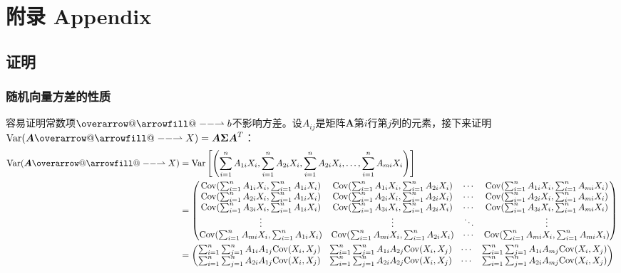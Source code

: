 \documentclass[UTF8]{ctexbook}
\makeatletter
\newcommand*{\overrightharpoonup}{\mathpalette{\overarrow@\rightharpoonupfill@}}
\newcommand*{\rightharpoonupfill@}{\arrowfill@\relbar\relbar\rightharpoonup}
\let\Vector\overrightharpoonup
\makeatother
\begin{document}
\chapter{附录 Appendix}
\section{证明}
\subsection{随机向量方差的性质}
\label{proof:vector-var-prop}
容易证明常数项$\Vector{b}$不影响方差。设$A_{ij}$是矩阵$\boldsymbol{A}$第$i$行第$j$列的元素，接下来证明$\mathrm{Var}(\boldsymbol{A}\Vector{X})=\boldsymbol{A}\boldsymbol{\Sigma}\boldsymbol{A}^T$：
\begin{align*}
	\mathrm{Var}(\boldsymbol{A}\Vector{X})&=\mathrm{Var}\left[\left(\sum_{i=1}^nA_{1i}X_i, \sum_{i=1}^nA_{2i}X_i,\sum_{i=1}^nA_{2i}X_i, \dots, \sum_{i=1}^nA_{mi}X_i\right)\right] \\
	&=\begin{pmatrix}
		\mathrm{Cov}(\sum_{i=1}^nA_{1i}X_i, \sum_{i=1}^nA_{1i}X_i) & \mathrm{Cov}(\sum_{i=1}^nA_{1i}X_i, \sum_{i=1}^nA_{2i}X_i) & \cdots & \mathrm{Cov}(\sum_{i=1}^nA_{1i}X_i, \sum_{i=1}^nA_{mi}X_i) \\
		\mathrm{Cov}(\sum_{i=1}^nA_{2i}X_i, \sum_{i=1}^nA_{1i}X_i) & \mathrm{Cov}(\sum_{i=1}^nA_{2i}X_i, \sum_{i=1}^nA_{2i}X_i) & \cdots & \mathrm{Cov}(\sum_{i=1}^nA_{2i}X_i, \sum_{i=1}^nA_{mi}X_i) \\
		\mathrm{Cov}(\sum_{i=1}^nA_{3i}X_i, \sum_{i=1}^nA_{1i}X_i) & \mathrm{Cov}(\sum_{i=1}^nA_{3i}X_i, \sum_{i=1}^nA_{2i}X_i) & \cdots & \mathrm{Cov}(\sum_{i=1}^nA_{3i}X_i, \sum_{i=1}^nA_{mi}X_i) \\
		\vdots & \vdots & \ddots & \vdots \\
		\mathrm{Cov}(\sum_{i=1}^nA_{mi}X_i, \sum_{i=1}^nA_{1i}X_i) & \mathrm{Cov}(\sum_{i=1}^nA_{mi}X_i, \sum_{i=1}^nA_{2i}X_i) & \cdots & \mathrm{Cov}(\sum_{i=1}^nA_{mi}X_i, \sum_{i=1}^nA_{mi}X_i)
	\end{pmatrix} \\
	&=\begin{pmatrix}
		\sum_{i=1}^n\sum_{j=1}^nA_{1i}A_{1j}\mathrm{Cov}(X_i, X_j) & \sum_{i=1}^n\sum_{j=1}^nA_{1i}A_{2j}\mathrm{Cov}(X_i, X_j) & \cdots & \sum_{i=1}^n\sum_{j=1}^nA_{1i}A_{mj}\mathrm{Cov}(X_i, X_j) \\
		\sum_{i=1}^n\sum_{j=1}^nA_{2i}A_{1j}\mathrm{Cov}(X_i, X_j) & \sum_{i=1}^n\sum_{j=1}^nA_{2i}A_{2j}\mathrm{Cov}(X_i, X_j) & \cdots & \sum_{i=1}^n\sum_{j=1}^nA_{2i}A_{mj}\mathrm{Cov}(X_i, X_j) \\

\end{pmatrix}
\end{align*}
\end{document}
